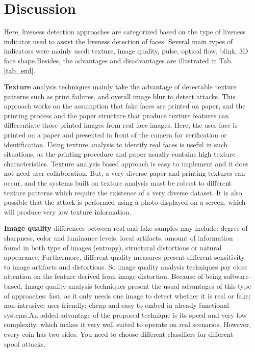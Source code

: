 \documentclass[journal]{IEEEtran}
\begin{document}
\section{Discussion}

Here, liveness detection approaches are categorized based on the type of liveness indicator used to assist the liveness detection of faces. Several main types of indicators were mainly used: texture, image quality, pulse, optical flow, blink, 3D face shape.Besides, the advantages and disadvantages are illustrated in Tab. \ref{tab_end}.


\textbf{Texture} analysis techniques mainly take the advantage of detectable texture patterns such as print failures, and overall image blur to detect attacks. This approach works on the assumption that fake faces are printed on paper, and the printing process and the paper structure that produce texture features can differentiate those printed images from real face images. Here, the user face is printed on a paper and presented in front of the camera for verification or identification. Using texture analysis to identify real faces is useful in such situations, as the printing procedure and paper usually contains high texture characteristics. Texture analysis based approach is easy to implement and it does not need user collaboration. But, a very diverse paper and printing textures can occur, and the systems built on texture analysis must be robust to different texture patterns which require the existence of a very diverse dataset. It is also possible that the attack is performed using a photo displayed on a screen, which will produce very low texture information.

\textbf{Image quality} differences between real and fake samples may include: degree of sharpness, color and luminance levels, local artifacts, amount of information found in both type of images (entropy), structural distortions or natural appearance. Furthermore, different quality measures present different sensitivity to image artifacts and distortions. So image quality analysis techniques pay close attention on the feature derived from image distortion. Because of being software-based, Image quality analysis techniques present the usual advantages of this type of approaches: fast, as it only needs one image to detect whether it is real or fake; non-intrusive; user-friendly; cheap and easy to embed in already functional systems.An added advantage of the proposed technique is its speed and very low complexity, which makes it very well suited to operate on real scenarios. However, every coin has two sides. You need to choose different classifiers for different spoof attacks. 
\end{document}
